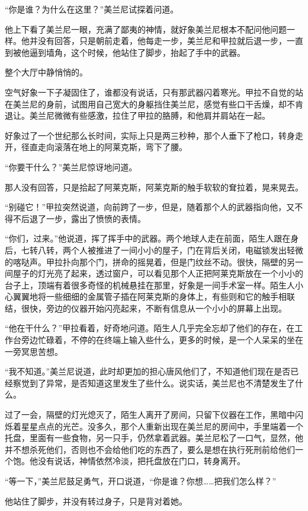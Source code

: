 “你是谁？为什么在这里？”美兰尼试探着问道。 

他上下看了美兰尼一眼，充满了鄙夷的神情，就好象美兰尼根本不配问他问题一样。他并没有回答，只是朝前走着，他每走一步，美兰尼和甲拉就后退一步，一直到被他逼到墙角，这个时候，他站住了脚步，抬起了手中的武器。 

整个大厅中静悄悄的。 

空气好象一下子凝固住了，谁都没有说话，只有那武器闪着寒光。甲拉不自觉的站在美兰尼的身前，试图用自己宽大的身躯挡住美兰尼，感觉有些口干舌燥，却不肯退让。美兰尼微微有些感激，拉住了甲拉的胳膊，和他肩并肩站在一起。 

好象过了一个世纪那么长时间，实际上只是两三秒种，那个人垂下了枪口，转身走开，径直走向滚落在地上的阿莱克斯，弯下了腰。 

“你要干什么？”美兰尼惊讶地问道。 

那人没有回答，只是拾起了阿莱克斯，阿莱克斯的触手软软的耷拉着，晃来晃去。 

“别碰它！”甲拉突然说道，向前跨了一步，但是，随着那个人的武器指向他，又不得不后退了一步，露出了愤愤的表情。 

“你们，过来。”他说道，挥了挥手中的武器。两个地球人走在前面，陌生人跟在身后，七转八转，两个人被推进了一间小小的屋子，门在背后关闭，电磁锁发出轻微的喀哒声。甲拉扑向那个门，拼命的摇晃着，但是门纹丝不动。很快，隔壁的另一间屋子的灯光亮了起来，透过窗户，可以看见那个人正把阿莱克斯放在一个小小的台子上，顶端有着很多奇怪的机械悬挂在那里，好象是一间手术室一样。陌生人小心翼翼地将一些细细的金属管子插在阿莱克斯的身体上，有些则和它的触手相联结，很快，旁边的仪器开始闪亮起来，不断有信息从一个小小的屏幕上出现。 

“他在干什么？”甲拉看着，好奇地问道。陌生人几乎完全忘却了他们的存在，在工作台旁边忙碌着，不停的在终端上输入些什么，更多的时候，是一个人呆呆的坐在一旁冥思苦想。 

“我不知道。”美兰尼说道，此时却更加的担心唐风他们了，不知道他们现在是否已经察觉到了异常，是否知道这里发生了些什么。说实话，美兰尼也不清楚发生了什么。 

过了一会，隔壁的灯光熄灭了，陌生人离开了房间，只留下仪器在工作，黑暗中闪烁着星星点点的光芒。没多久，那个人重新出现在美兰尼的房间中，手里端着一个托盘，里面有一些食物，另一只手，仍然拿着武器。美兰尼松了一口气，显然，他并不想杀死他们，否则也不会给他们吃的东西了，要么是想在执行死刑前给他们一个饱。他没有说话，神情依然冷淡，把托盘放在门口，转身离开。 

“等一下，”美兰尼鼓足勇气，开口说道，“你是谁？你想……把我们怎么样？” 

他站住了脚步，并没有转过身子，只是背对着她。 

